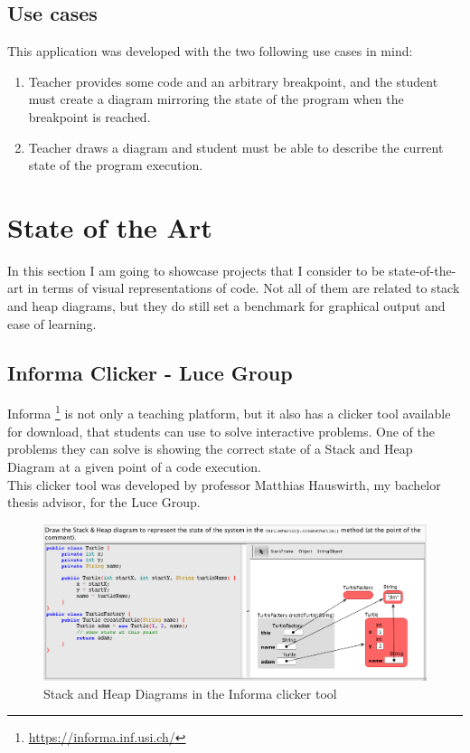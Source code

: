 \documentclass[]{usiinfbachelorproject}
\begin{document}
\subsection{Use cases}

This application was developed with the two following use cases in mind:

\begin{enumerate}
\item Teacher provides some code and an arbitrary breakpoint, and the student must create  a diagram mirroring the state of the program when the breakpoint is reached.
\item Teacher draws a diagram and student must be able to describe the current state of the program execution.
\end{enumerate}

\vspace{\fill}
\pagebreak

\section{State of the Art} \label{state}

In this section I am going to showcase projects that I consider to be state-of-the-art in terms of visual representations of code. Not all of them are related to stack and heap diagrams, but they do still set a benchmark for graphical output and ease of learning.

\subsection{Informa Clicker - Luce Group}

\noindent Informa \footnote{\url{https://informa.inf.usi.ch/}} is not only a teaching platform, but it also has a clicker tool available for download, that students can use to solve interactive problems. One of the problems they can solve is showing the correct state of a Stack and Heap Diagram at a given point of a code execution.\\

\noindent This clicker tool was developed by professor Matthias Hauswirth, my bachelor thesis advisor, for the Luce Group.

\begin{figure}[h!]
\includegraphics[scale=0.4]{figures/informa_clicker.png}
\centering
\caption {Stack and Heap Diagrams in the Informa clicker tool}
\end{figure}
\end{document}
